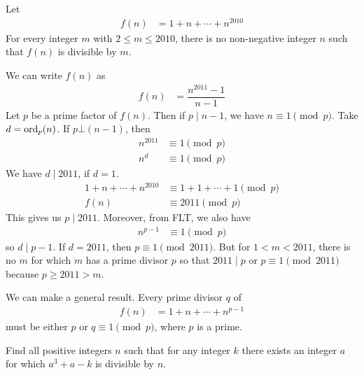 \begin{problem}[Austria $2010$]
	Let
		\begin{align*}
			f(n) & = 1+n+\cdots+n^{2010}
		\end{align*}
	For every integer $m$ with $2\leq m\leq2010$, there is no non-negative integer $n$ such that $f(n)$ is divisible by $m$.
\end{problem}

\begin{solution}
	We can write $f(n)$ as
		\begin{align*}
			f(n) & = \dfrac{n^{2011}-1}{n-1}
		\end{align*}
	Let $p$ be a prime factor of $f(n)$. Then if $p\mid n-1$, we have $n\equiv1\pmod p$.  Take $d = \operatorname{ord}_p(n)$. If $p\bot (n-1)$, then
		\begin{align*}
			n^{2011}&\equiv1\pmod p\\
			n^d&\equiv1\pmod p
		\end{align*}
	We have $d\mid 2011$, if $d=1$.
		\begin{align*}
			1+n+\cdots+n^{2010} & \equiv1+1+\cdots+1\pmod p\\
			f(n) & \equiv2011\pmod p
		\end{align*}
	This gives us $p\mid 2011$. Moreover, from FLT, we also have
		\begin{align*}
			n^{p-1}&\equiv1\pmod p
		\end{align*}
	so $d\mid p-1$. If $d=2011$, then $p\equiv1\pmod{2011}$. But for $1<m<2011$, there is no $m$ for which $m$ has a prime divisor $p$ so that $2011\mid p$ or $p\equiv1\pmod{2011}$ because $p\geq2011>m$.
\end{solution}

\begin{remark}
	We can make a general result. Every prime divisor $q$ of
		\begin{align*}
			f(n) & = 1+n+\cdots+n^{p-1}
		\end{align*}
	must be either $p$ or $q\equiv1\pmod p$, where $p$ is a prime.
\end{remark}

\begin{problem}
	Find all positive integers $n$ such that for any integer $k$ there exists an integer $a$ for which $a^3 + a-k$ is divisible by $n$.
\end{problem}

